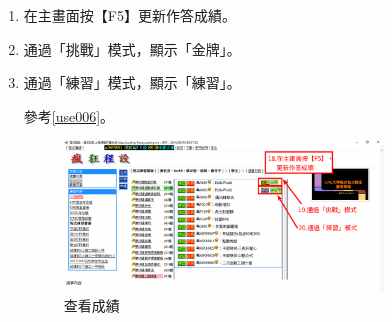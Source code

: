 \begin{enumerate}
\item 在主畫面按【F5】更新作答成績。
\item 通過「挑戰」模式，顯示「金牌」。
\item 通過「練習」模式，顯示「練習」。

參考\autoref{use006}。
\begin{figure}[H]
	\centering
	\includegraphics[width=0.8\textwidth]{fig/install_and_setting/use_006}
	\caption{查看成績}
	\label{use006}
\end{figure}

\end{enumerate}
